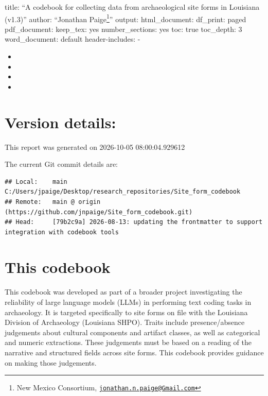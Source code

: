 \documentclass[
]{article}
\author{}
\date{\vspace{-2.5em}}
\begin{document}
title: ``A codebook for collecting data from archaeological site forms
in Louisiana (v1.3)'' author: ``Jonathan Paige\footnote{New Mexico
  Consortium,
  \href{mailto:jonathan.n.paige@Gmail.com}{\nolinkurl{jonathan.n.paige@Gmail.com}}}''
output: html\_document: df\_print: paged pdf\_document: keep\_tex: yes
number\_sections: yes toc: true toc\_depth: 3 word\_document: default
header-includes: -

\usepackage{float}

\begin{itemize}
\item
\item
  \usepackage{booktabs}
\item
  \usepackage[font=small,labelfont=bf]{caption}
\item
  \usepackage{setspace}\doublespacing
\end{itemize}

\section{Version details:}\label{version-details}

This report was generated on 2026-10-05 08:00:04.929612

The current Git commit details are:

\begin{verbatim}
## Local:    main C:/Users/jpaige/Desktop/research_repositories/Site_form_codebook
## Remote:   main @ origin (https://github.com/jnpaige/Site_form_codebook.git)
## Head:     [79b2c9a] 2026-08-13: updating the frontmatter to support integration with codebook tools
\end{verbatim}

\section{This codebook}\label{this-codebook}

This codebook was developed as part of a broader project investigating
the reliability of large language models (LLMs) in performing text
coding tasks in archaeology. It is targeted specifically to site forms
on file with the Louisiana Division of Archaeology (Louisiana SHPO).
Traits include presence/absence judgements about cultural components and
artifact classes, as well as categorical and numeric extractions. These
judgements must be based on a reading of the narrative and structured
fields across site forms. This codebook provides guidance on making
those judgements.
\end{document}
